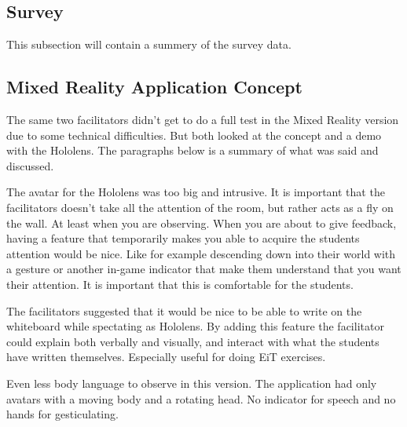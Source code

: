     
        \subsection{Survey} %
        This subsection will contain a summery of the survey data.
        
        
        
        
        
        
        
        \subsection{Mixed Reality Application Concept} %
        The same two facilitators didn't get to do a full test in the Mixed Reality version due to some technical difficulties. But both looked at the concept and a demo with the Hololens. The paragraphs below is a summary of what was said and discussed.
        
        The avatar for the Hololens was too big and intrusive. It is important that the facilitators doesn't take all the attention of the room, but rather acts as a fly on the wall. At least when you are observing. When you are about to give feedback, having a feature that temporarily makes you able to acquire the students attention would be nice. Like for example descending down into their world with a gesture or another in-game indicator that make them understand that you want their attention. It is important that this is comfortable for the students.
        
        The facilitators suggested that it would be nice to be able to write on the whiteboard while spectating as Hololens. By adding this feature the facilitator could explain both verbally and visually, and interact with what the students have written themselves. Especially useful for doing EiT exercises.
        
        Even less body language to observe in this version. The application had only avatars with a moving body and a rotating head. No indicator for speech and no hands for gesticulating.
        

